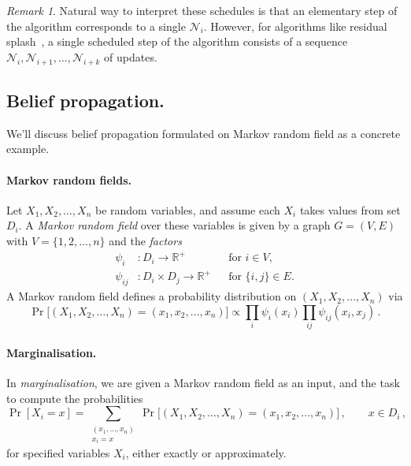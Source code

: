 \documentclass[11pt,a4paper]{article}
\theoremstyle{remark}
\newtheorem{remark}[theorem]{Remark}
\newcommand{\Reals}{\mathbb{R}}
\newcommand{\N}{\mathcal{N}}
\newcommand{\range}{D}
\begin{document}
\begin{remark}
Natural way to interpret these schedules is that an elementary step of the algorithm corresponds to a single $\N_i$. However, for algorithms like residual splash~\cite{pmlr-v5-gonzalez09a}, a single scheduled step of the algorithm consists of a sequence $\N_i, \N_{i+1}, \dotsc, \N_{i+k}$ of updates.
\end{remark}

\subsection{Belief propagation.}

We'll discuss belief propagation formulated on Markov random field as a concrete example.

\paragraph{Markov random fields.} Let $X_1, X_2, \dotsc, X_n$ be random variables, and assume each $X_i$ takes values from set $\range_i$. A \emph{Markov random field} over these variables is given by a graph $G = (V,E)$ with $V = \{ 1, 2, \dotsc, n \}$ and the \emph{factors}
\begin{align}
    \psi_{i} & \colon \range_i \to \Reals^+ && \text{for $i \in V$,}\\
    \psi_{ij} & \colon \range_i \times \range_j \to \Reals^+ && \text{for $\{i, j\} \in E$.}
\end{align}
A Markov random field defines a probability distribution on $(X_1, X_2, \dotsc, X_n)$ via
\[ \Pr\bigl[ (X_1, X_2, \dotsc, X_n) = (x_1, x_2, \dotsc, x_n) \bigr] \propto \prod_{i} \psi_i(x_i) \prod_{ij} \psi_{ij}(x_i, x_j) \,.\]

\paragraph{Marginalisation.} In \emph{marginalisation}, we are given a Markov random field as an input, and the task to compute the probabilities
\[ \Pr[ X_i = x ] = \sum_{\substack{ (x_1,\dotsc, x_n) \\ x_i = x}} \Pr\bigl[ (X_1, X_2, \dotsc, X_n) = (x_1, x_2, \dotsc, x_n)\bigr]\,, \qquad x \in \range_i\,,\]
for specified variables $X_i$, either exactly or approximately.
\end{document}
